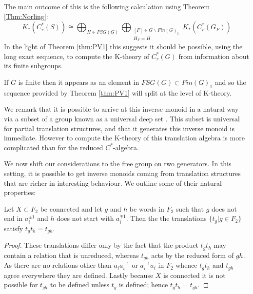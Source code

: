 \begin{example}
The main outcome of this is the following calculation using Theorem \ref{Thm:Norling}:
\begin{equation*}
K_{*}(C^{*}_{r}(S)) \cong  \bigoplus_{H \in FSG(G)} \bigoplus_{\substack{[F] \in G \backslash Fin(G)_{1}\\H_{F}=H}} K_{*}(C^{*}_{r}(G_{F}))
\end{equation*}
In the light of Theorem \ref{thm:PV1} this suggests it should be possible, using the long exact sequence, to compute the K-theory of $C^{*}_{r}(G)$ from information about its finite subgroups.

If $G$ is finite then it appears as an element in $FSG(G) \subset Fin(G)_{1}$ and so the sequence provided by Theorem \ref{thm:PV1} will split at the level of K-theory. 

We remark that it is possible to arrive at this inverse monoid in a natural way via a subset of a group known as a universal deep set \cite{BNW-KTA}. This subset is universal for partial translation structures, and that it generates this inverse monoid is immediate. However to compute the K-theory of this translation algebra is more complicated than for the reduced $C^{*}$-algebra.

\end{example}

We now shift our considerations to the free group on two generators. In this setting, it is possible to get inverse monoids coming from translation structures that are richer in interesting behaviour. We outline some of their natural properties:

\begin{claim}
Let $X \subset F_{2}$ be connected and let $g$ and $h$ be words in $F_{2}$ such that $g$ does not end in $a_{i}^{\pm 1}$ and $h$ does not start with $a_{i}^{\mp 1}$. Then the the translations $\lbrace t_{g} | g \in F_{2} \rbrace$ satisfy $t_{g}t_{h}=t_{gh}$. 
\end{claim}
\begin{proof}
These translations differ only by the fact that the product $t_{g}t_{h}$ may contain a relation that is unreduced, whereas $t_{gh}$ acts by the reduced form of $gh$. As there are no relations other than $a_{i}a_{i}^{-1}$ or $a_{i}^{-1}a_{i}$ in $F_{2}$ whence $t_{g}t_{h}$ and $t_{gh}$ agree everywhere they are defined. Lastly because $X$ is connected it is not possible for $t_{gh}$ to be defined unless $t_{g}$ is defined; hence $t_{g}t_{h}=t_{gh}$.
\end{proof}


